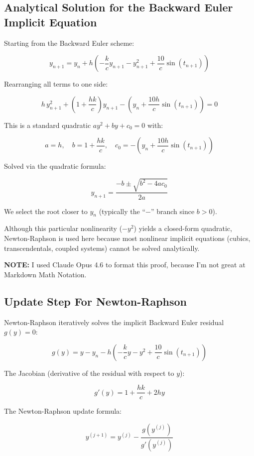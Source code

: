 \documentclass[11pt]{article}
\begin{document}
\subsection{Analytical Solution for the Backward Euler Implicit
Equation}\label{analytical-solution-for-the-backward-euler-implicit-equation}

Starting from the Backward Euler scheme:

\[y_{n+1} = y_n + h\left(-\frac{k}{c}y_{n+1} - y_{n+1}^2 + \frac{10}{c}\sin(t_{n+1})\right)\]

Rearranging all terms to one side:

\[h\,y_{n+1}^2 + \left(1 + \frac{hk}{c}\right)y_{n+1} - \left(y_n + \frac{10h}{c}\sin(t_{n+1})\right) = 0\]

This is a standard quadratic \(ay^2 + by + c_0 = 0\) with:

\[a = h, \quad b = 1 + \frac{hk}{c}, \quad c_0 = -\left(y_n + \frac{10h}{c}\sin(t_{n+1})\right)\]

Solved via the quadratic formula:

\[y_{n+1} = \frac{-b \pm \sqrt{b^2 - 4ac_0}}{2a}\]

We select the root closer to \(y_n\) (typically the ``\(-\)'' branch
since \(b > 0\)).

Although this particular nonlinearity (\(-y^2\)) yields a closed-form
quadratic, Newton-Raphson is used here because most nonlinear implicit
equations (cubics, transcendentals, coupled systems) cannot be solved
analytically.

\textbf{NOTE:} I used Claude Opus 4.6 to format this proof, because I'm
not great at Markdown Math Notation.

\subsection{Update Step For
Newton-Raphson}\label{update-step-for-newton-raphson}

Newton-Raphson iteratively solves the implicit Backward Euler residual
\(g(y) = 0\):

\[g(y) = y - y_n - h\left(-\frac{k}{c}y - y^2 + \frac{10}{c}\sin(t_{n+1})\right)\]

The Jacobian (derivative of the residual with respect to \(y\)):

\[g'(y) = 1 + \frac{hk}{c} + 2hy\]

The Newton-Raphson update formula:

\[y^{(j+1)} = y^{(j)} - \frac{g(y^{(j)})}{g'(y^{(j)})}\]
\end{document}
